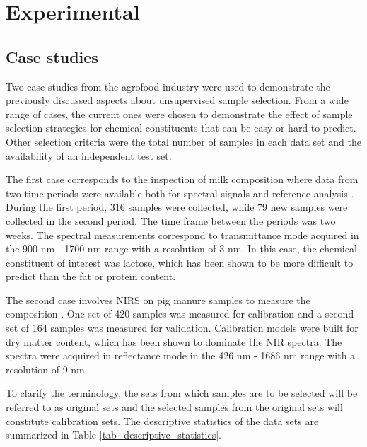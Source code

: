 \documentclass[journal=ancham,manuscript=article]{achemso}
\begin{document}

\section{Experimental}\label{experimental}

\subsection{Case studies}\label{data}

Two case studies from the agrofood industry were used to demonstrate the previously discussed aspects about unsupervised sample selection. From a wide range of cases, the current ones were chosen to demonstrate the effect of sample selection strategies for chemical constituents that can be easy or hard to predict. Other selection criteria were the total number of samples in each data set and the availability of an independent test set. 

The first case corresponds to the inspection of milk composition where data from two time periods were available both for spectral signals and reference analysis \cite{Diaz-Olivares2020}. During the first period, 316 samples were collected, while 79 new samples were collected in the second period. The time frame between the periods was two weeks. The spectral measurements correspond to transmittance mode acquired in the 900 nm - 1700 nm range with a resolution of 3 nm. In this case, the chemical constituent of interest was lactose, which has been shown to be more difficult to predict than the fat or protein content\cite{Aernouts2011}.

The second case involves NIRS on pig manure samples to measure the composition \cite{Saeys2005}. One set of 420 samples was measured for calibration and a second set of 164 samples was measured for validation. Calibration models were built for dry matter content, which has been shown to dominate the NIR spectra. The spectra were acquired in reflectance mode in the 426 nm - 1686 nm range with a resolution of 9 nm.

To clarify the terminology, the sets from which samples are to be selected will be referred to as original sets and the selected samples from the original sets will constitute calibration sets. The descriptive statistics of the data sets are summarized in Table \ref{tab_descriptive_statistics}.
\end{document}
